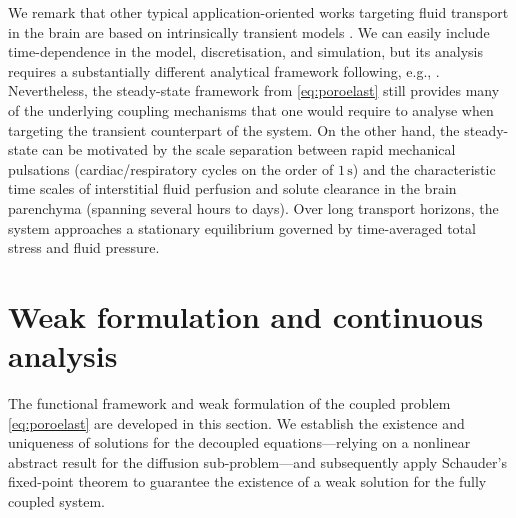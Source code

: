 \documentclass[fleqn,a4paper]{cas-sc}
\newcommand{\0}{\boldsymbol{0}}
\numberwithin{equation}{section}
\numberwithin{figure}{section}
\begin{document}
{We remark that other typical application-oriented works targeting fluid transport in the brain are based on intrinsically transient models \cite{tully2011cerebral,guo2019validation}. We can easily include time-dependence in the model, discretisation, and simulation, but its analysis requires a substantially different analytical framework following, e.g., \cite{showalter1997}. Nevertheless, the steady-state framework from \eqref{eq:poroelast} still provides many of the underlying coupling mechanisms that one would require to analyse when targeting the transient counterpart of the system. On the other hand, 
the steady-state can be motivated by the scale separation between rapid mechanical pulsations (cardiac/respiratory cycles on the order of $1\,\text{s}$) and the characteristic time scales of interstitial fluid perfusion and solute clearance in the brain parenchyma (spanning several hours to days). Over long transport horizons, the system approaches a stationary equilibrium governed by time-averaged total stress and fluid pressure. }

\section{Weak formulation and continuous analysis}\label{sec:continuous_wp}
The functional framework and weak formulation of the coupled problem \eqref{eq:poroelast} are developed in this section. We establish the existence and uniqueness of solutions for the decoupled equations—relying on a nonlinear abstract result for the diffusion sub-problem—and subsequently apply Schauder's fixed-point theorem to guarantee the existence of a weak solution for the fully coupled system.
\end{document}
